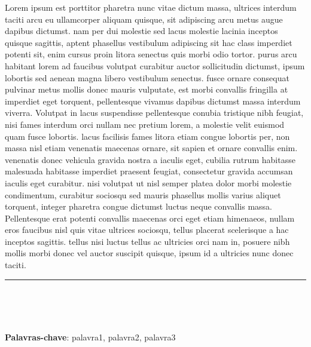 \documentclass[12pt]{article}
\begin{document}
Lorem ipsum est porttitor pharetra nunc vitae dictum massa, ultrices interdum taciti arcu eu ullamcorper aliquam quisque, sit adipiscing arcu metus augue dapibus dictumst. nam per dui molestie sed lacus molestie lacinia inceptos quisque sagittis, aptent phasellus vestibulum adipiscing sit hac class imperdiet potenti sit, enim cursus proin litora senectus quis morbi odio tortor. purus arcu habitant lorem ad faucibus volutpat curabitur auctor sollicitudin dictumst, ipsum lobortis sed aenean magna libero vestibulum senectus. fusce ornare consequat pulvinar metus mollis donec mauris vulputate, est morbi convallis fringilla at imperdiet eget torquent, pellentesque vivamus dapibus dictumst massa interdum viverra. Volutpat in lacus suspendisse pellentesque conubia tristique nibh feugiat, nisi fames interdum orci nullam nec pretium lorem, a molestie velit euismod quam fusce lobortis. lacus facilisis fames litora etiam congue lobortis per, non massa nisl etiam venenatis maecenas ornare, sit sapien et ornare convallis enim. venenatis donec vehicula gravida nostra a iaculis eget, cubilia rutrum habitasse malesuada habitasse imperdiet praesent feugiat, consectetur gravida accumsan iaculis eget curabitur. nisi volutpat ut nisl semper platea dolor morbi molestie condimentum, curabitur sociosqu sed mauris phasellus mollis varius aliquet torquent, integer pharetra congue dictumst luctus neque convallis massa. Pellentesque erat potenti convallis maecenas orci eget etiam himenaeos, nullam eros faucibus nisl quis vitae ultrices sociosqu, tellus placerat scelerisque a hac inceptos sagittis. tellus nisi luctus tellus ac ultricies orci nam in, posuere nibh mollis morbi donec vel auctor suscipit quisque, ipsum id a ultricies nunc donec taciti. 
\\
\rule{5cm}{0.4mm} %
\\
\renewcommand{\footnotesize}{\smaller[2]} %
\author{
\\{\footnotesize 1 Estudante do Curso de ... do Laboratório de ... do Centro ...; E-mail: email@email.com}\\
{\footnotesize 2 Estudante do Curso de ... do Laboratório de ... do Centro ...; E-mail: email@email.com}\\
{\footnotesize 3 Estudante do Curso de ... do Laboratório de ... do Centro ...; E-mail: email@email.com}
}
\\
\\
\textbf{Palavras-chave}: palavra1, palavra2, palavra3
\pagebreak %
\end{document}
